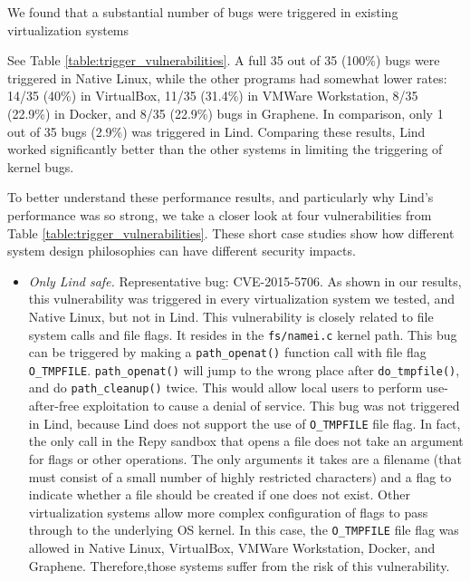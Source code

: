 We found that a substantial number of bugs were triggered in existing
virtualization systems {See Table \ref{table:trigger_vulnerabilities}.
A full 35 out of 35 (100\%) bugs were triggered in Native Linux,
while the other programs had somewhat lower rates: 14/35 (40\%) in
VirtualBox,
11/35 (31.4\%)  in VMWare Workstation, 8/35 (22.9\%)  in Docker, and 8/35
(22.9\%) bugs in Graphene.
In comparison, only 1 out of 35 bugs  (2.9\%) was triggered in Lind.
 Comparing
 these results, Lind worked significantly better than the other
systems in limiting the triggering of kernel bugs.

To better understand these performance results, and particularly why Lind's
performance was so strong, we take a closer look at four
vulnerabilities from Table \ref{table:trigger_vulnerabilities}. These short case
studies show how different system design philosophies can have
 different security impacts.
\begin{itemize}
\item \emph{Only Lind safe.}  Representative bug: CVE-2015-5706. As
shown in our results, this vulnerability was triggered in every
virtualization system we tested, and Native Linux, but not in Lind. This vulnerability
is closely related to file system calls and file flags. It resides in the \texttt{fs/namei.c}
kernel path. This bug can be triggered by making a \texttt{path\_openat()} function
call with file flag \texttt{O\_TMPFILE}. \texttt{path\_openat()} will jump to the wrong
place after \texttt{do\_tmpfile()}, and do \texttt{path\_cleanup()} twice. This would
allow local users to perform use-after-free exploitation to cause a denial of service.
This bug was not triggered in Lind, because Lind does not support the use of
\texttt{O\_TMPFILE} file flag. In fact, the only call in the Repy sandbox that
opens a file does not take an argument for flags or other operations.  The
only arguments it takes are a filename (that must consist of a small number
of highly restricted characters) and a flag to indicate whether a file should
be created if one does not exist.
Other virtualization systems allow more complex configuration of flags to
pass through to the underlying OS kernel.   
In this case, the \texttt{O\_TMPFILE} file flag was
allowed in Native Linux, VirtualBox, VMWare Workstation, Docker, and Graphene.
Therefore,those systems suffer from the risk of this vulnerability.


\end{itemize}}
